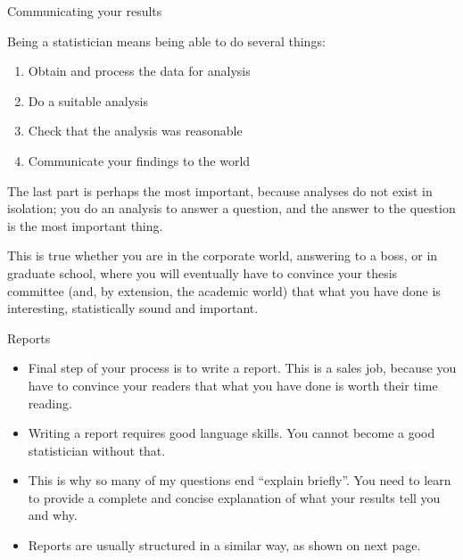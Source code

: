 \documentclass[
  ignorenonframetext,
]{beamer}
\providecommand{\tightlist}{%
  \setlength{\itemsep}{0pt}\setlength{\parskip}{0pt}}
\begin{document}
\begin{frame}{Communicating your results}
\protect\hypertarget{communicating-your-results}{}

Being a statistician means being able to do several things:

\begin{enumerate}
\tightlist
\item
  Obtain and process the data for analysis
\item
  Do a suitable analysis
\item
  Check that the analysis was reasonable
\item
  Communicate your findings to the world
\end{enumerate}

The last part is perhaps the most important, because analyses do not
exist in isolation; you do an analysis to answer a question, and the
answer to the question is the most important thing.

This is true whether you are in the corporate world, answering to a
boss, or in graduate school, where you will eventually have to convince
your thesis committee (and, by extension, the academic world) that what
you have done is interesting, statistically sound and important.

\end{frame}

\begin{frame}{Reports}
\protect\hypertarget{reports}{}

\begin{itemize}
\tightlist
\item
  Final step of your process is to write a report. This is a sales job,
  because you have to convince your readers that what you have done is
  worth their time reading.
\item
  Writing a report requires good language skills. You cannot become a
  good statistician without that.
\item
  This is why so many of my questions end ``explain briefly''. You need
  to learn to provide a complete and concise explanation of what your
  results tell you and why.
\item
  Reports are usually structured in a similar way, as shown on next
  page.
\end{itemize}

\end{frame}
\end{document}
